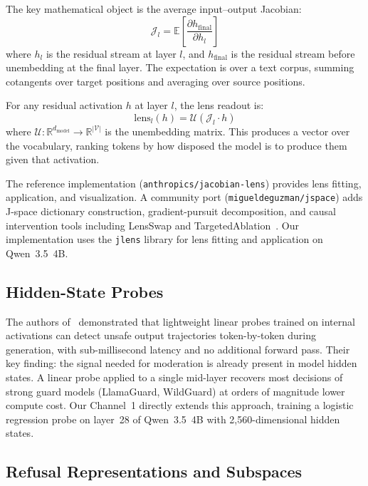 \documentclass[11pt]{article}
\newcommand{\lens}{\mathcal{J}}
\newcommand{\unembed}{\mathcal{U}}
\newcommand{\vocab}{\mathcal{V}}
\newcommand{\R}{\mathbb{R}}
\begin{document}
The key mathematical object is the average input--output Jacobian:
\begin{equation}
\lens_l = \mathbb{E}\!\left[\frac{\partial h_{\text{final}}}{\partial h_l}\right]
\label{eq:jacobian}
\end{equation}
where $h_l$ is the residual stream at layer $l$, and $h_{\text{final}}$ is the residual stream before unembedding at the final layer. The expectation is over a text corpus, summing cotangents over target positions and averaging over source positions.

For any residual activation $h$ at layer $l$, the lens readout is:
\begin{equation}
\text{lens}_l(h) = \unembed(\lens_l \cdot h)
\label{eq:lens_readout}
\end{equation}
where $\unembed : \R^{d_{\text{model}}} \to \R^{|\vocab|}$ is the unembedding matrix. This produces a vector over the vocabulary, ranking tokens by how disposed the model is to produce them given that activation.

The reference implementation (\texttt{anthropics/jacobian-lens}) provides lens fitting, application, and visualization. A community port (\texttt{migueldeguzman/jspace}) adds J-space dictionary construction, gradient-pursuit decomposition, and causal intervention tools including LensSwap and TargetedAblation~\cite{jspace2026}. Our implementation uses the \texttt{jlens} library for lens fitting and application on Qwen~3.5~4B.

\subsection{Hidden-State Probes}

The authors of~\cite{hiddensstate2026} demonstrated that lightweight linear probes trained on internal activations can detect unsafe output trajectories token-by-token during generation, with sub-millisecond latency and no additional forward pass. Their key finding: the signal needed for moderation is already present in model hidden states. A linear probe applied to a single mid-layer recovers most decisions of strong guard models (LlamaGuard, WildGuard) at orders of magnitude lower compute cost. Our Channel~1 directly extends this approach, training a logistic regression probe on layer~28 of Qwen~3.5~4B with 2,560-dimensional hidden states.

\subsection{Refusal Representations and Subspaces}
\end{document}
